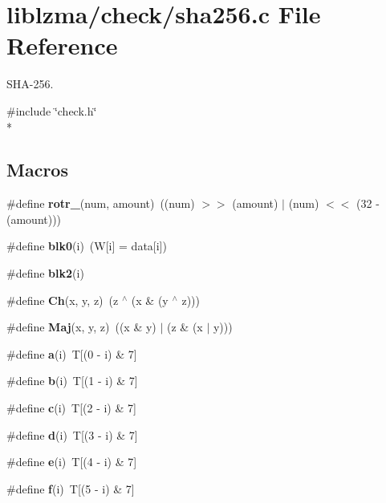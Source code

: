 \section{liblzma/check/sha256.c File Reference}
\label{sha256_8c}


S\-H\-A-\/256.  


{\ttfamily \#include \char`\"{}check.\-h\char`\"{}}\\*
\subsection*{Macros}
\begin{DoxyCompactItemize}
\item 
\#define {\bfseries rotr\-\_}(num, amount)~((num) $>$$>$ (amount) $|$ (num) $<$$<$ (32 -\/ (amount)))\label{sha256_8c_ad26d1f631a84e8bf3706cf39c23a06a0}

\item 
\#define {\bfseries blk0}(i)~(W[i] = data[i])\label{sha256_8c_a1a75de24d0277c5319098c218efaef2d}

\item 
\#define {\bfseries blk2}(i)
\item 
\#define {\bfseries Ch}(x, y, z)~(z $^\wedge$ (x \& (y $^\wedge$ z)))\label{sha256_8c_ab0a0d1ad13c7e4d3cb38c89f7127c85a}

\item 
\#define {\bfseries Maj}(x, y, z)~((x \& y) $|$ (z \& (x $|$ y)))\label{sha256_8c_a447cd1d7fb703b62666400976be24bf3}

\item 
\#define {\bfseries a}(i)~T[(0 -\/ i) \& 7]\label{sha256_8c_aa9b8e98b3989bdffd7f36b281c72a693}

\item 
\#define {\bfseries b}(i)~T[(1 -\/ i) \& 7]\label{sha256_8c_a337ad8a7e52da2d584c2018f2ec2c81e}

\item 
\#define {\bfseries c}(i)~T[(2 -\/ i) \& 7]\label{sha256_8c_a63f410abde93141c9013b7d3f3971738}

\item 
\#define {\bfseries d}(i)~T[(3 -\/ i) \& 7]\label{sha256_8c_a23b5b0a85bf5762c93a855f40c0343ce}

\item 
\#define {\bfseries e}(i)~T[(4 -\/ i) \& 7]\label{sha256_8c_af62772e2f383ddbe93a93eff2a5f543a}

\item 
\#define {\bfseries f}(i)~T[(5 -\/ i) \& 7]\label{sha256_8c_a357394e0f6f88c8a57bd893ab28dc8f8}


\end{DoxyCompactItemize}
